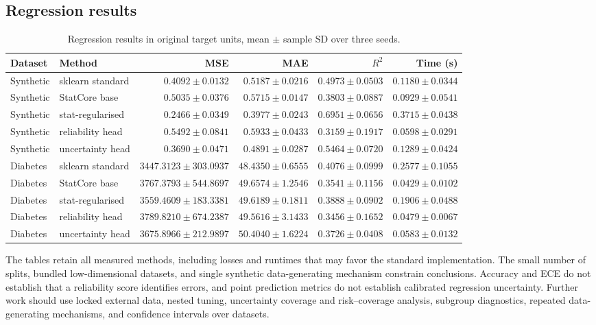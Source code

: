 \documentclass[conference]{IEEEtran}
\begin{document}
\subsection{Regression results}
\begin{table}[t]
\centering
\small\setlength{\tabcolsep}{3pt}
\caption{Regression results in original target units, mean $\pm$ sample SD over three seeds.}
\label{tab:reg-results}
\begin{tabular}{llrrrr}
\toprule
Dataset & Method & MSE & MAE & $R^2$ & Time (s)\\
\midrule
Synthetic & sklearn standard & $0.4092\pm0.0132$ & $0.5187\pm0.0216$ & $0.4973\pm0.0503$ & $0.1180\pm0.0344$\\
Synthetic & StatCore base & $0.5035\pm0.0376$ & $0.5715\pm0.0147$ & $0.3803\pm0.0887$ & $0.0929\pm0.0541$\\
Synthetic & stat-regularised & $0.2466\pm0.0349$ & $0.3977\pm0.0243$ & $0.6951\pm0.0656$ & $0.3715\pm0.0438$\\
Synthetic & reliability head & $0.5492\pm0.0841$ & $0.5933\pm0.0433$ & $0.3159\pm0.1917$ & $0.0598\pm0.0291$\\
Synthetic & uncertainty head & $0.3690\pm0.0471$ & $0.4891\pm0.0287$ & $0.5464\pm0.0720$ & $0.1289\pm0.0424$\\
Diabetes & sklearn standard & $3447.3123\pm303.0937$ & $48.4350\pm0.6555$ & $0.4076\pm0.0999$ & $0.2577\pm0.1055$\\
Diabetes & StatCore base & $3767.3793\pm544.8697$ & $49.6574\pm1.2546$ & $0.3541\pm0.1156$ & $0.0429\pm0.0102$\\
Diabetes & stat-regularised & $3559.4609\pm183.3381$ & $49.6189\pm0.1811$ & $0.3888\pm0.0902$ & $0.1906\pm0.0488$\\
Diabetes & reliability head & $3789.8210\pm674.2387$ & $49.5616\pm3.1433$ & $0.3456\pm0.1652$ & $0.0479\pm0.0067$\\
Diabetes & uncertainty head & $3675.8966\pm212.9897$ & $50.4040\pm1.6224$ & $0.3726\pm0.0408$ & $0.0583\pm0.0132$\\
\bottomrule
\end{tabular}
\end{table}

The tables retain all measured methods, including losses and runtimes that may favor the standard implementation. The small number of splits, bundled low-dimensional datasets, and single synthetic data-generating mechanism constrain conclusions. Accuracy and ECE do not establish that a reliability score identifies errors, and point prediction metrics do not establish calibrated regression uncertainty. Further work should use locked external data, nested tuning, uncertainty coverage and risk--coverage analysis, subgroup diagnostics, repeated data-generating mechanisms, and confidence intervals over datasets.
\end{document}
